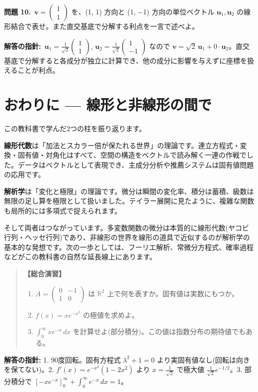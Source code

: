 \documentclass{article}
\begin{document}
\textbf{問題 10.}\ \(\boldsymbol{v} = \begin{pmatrix} 1 \\ 1 \end{pmatrix}\) を、(1, 1) 方向と (1, −1) 方向の単位ベクトル \(\boldsymbol{u}_1, \boldsymbol{u}_2\) の線形結合で表せ。また直交基底で分解する利点を一言で述べよ。

\textbf{解答の指針:}\ \(\boldsymbol{u}_1 = \frac{1}{\sqrt{2}}\begin{pmatrix} 1 \\ 1 \end{pmatrix}\), \(\boldsymbol{u}_2 = \frac{1}{\sqrt{2}}\begin{pmatrix} 1 \\ -1 \end{pmatrix}\) なので \(\boldsymbol{v} = \sqrt{2}\,\boldsymbol{u}_1 + 0 \cdot \boldsymbol{u}_2\)。直交基底で分解すると各成分が独立に計算でき、他の成分に影響を与えずに座標を扱えることが利点。

\section{おわりに — 線形と非線形の間で}

この教科書で学んだ2つの柱を振り返ります。

\textbf{線形代数}は「加法とスカラー倍が保たれる世界」の理論です。連立方程式・変換・固有値・対角化はすべて、空間の構造をベクトルで読み解く一連の作戦でした。データはベクトルとして表現でき、主成分分析や推薦システムは固有値問題の応用です。

\textbf{解析学}は「変化と極限」の理論です。微分は瞬間の変化率、積分は蓄積、級数は無限の足し算を極限として扱いました。テイラー展開に見たように、複雑な関数も局所的には多項式で捉えられます。

そして両者はつながっています。多変数関数の微分は本質的に線形代数(ヤコビ行列・ヘッセ行列)であり、非線形の世界を線形の道具で近似するのが解析学の基本的な発想です。次の一歩としては、フーリエ解析、常微分方程式、確率過程などがこの教科書の自然な延長線上にあります。

\begin{quote}
\textbf{【総合演習】}
\begin{enumerate}
\item \(A = \begin{pmatrix} 0 & -1 \\ 1 & 0 \end{pmatrix}\) は \(\mathbb{R}^2\) 上で何を表すか。固有値は実数にもつか。
\item \(f(x) = x e^{-x^2}\) の極値を求めよ。
\item \(\displaystyle \int_0^\infty x e^{-x}\, dx\) を計算せよ(部分積分)。この値は指数分布の期待値でもある。
\end{enumerate}
\end{quote}

\textbf{解答の指針:} 1. 90度回転。固有方程式 \(\lambda^2 + 1 = 0\) より実固有値なし(回転は向きを保てない)。2. \(f'(x) = e^{-x^2}(1 - 2x^2)\) より \(x = \frac{1}{\sqrt{2}}\) で極大値 \(\frac{1}{\sqrt{2}} e^{-1/2}\)。3. 部分積分で \([-x e^{-x}]_0^\infty + \int_0^\infty e^{-x}\, dx = 1\)。
\end{document}
